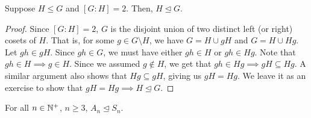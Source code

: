 \begin{prop} \label{prop:two-cosets-normal}
    Suppose $H \leq G$ and $[G:H] = 2$. Then, $H \trianglelefteq G$.
\end{prop}
\begin{proof}
    Since $[G:H] = 2$, $G$ is the disjoint union of two distinct left (or right) cosets of $H$. That is, for some $g \in G\setminus H$, we have $G = H \cup gH$ and $G = H \cup Hg$. Let $gh \in gH$. Since $gh \in G$, we must have either $gh \in H$ or $gh \in Hg$. Note that $gh \in H \implies g \in H$. Since we assumed $g \notin H$, we get that $gh \in Hg \implies gH \subseteq Hg$. A similar argument also shows that $Hg \subseteq gH$, giving us $gH = Hg$. We leave it as an exercise to show that $gH = Hg \implies H \trianglelefteq G$.
\end{proof}
\begin{cor} \label{cor:alternating-normal-symmetric}
    For all $n \in \mathbb{N}^+$, $n \geq 3$, $A_n \trianglelefteq S_n$.
\end{cor}

